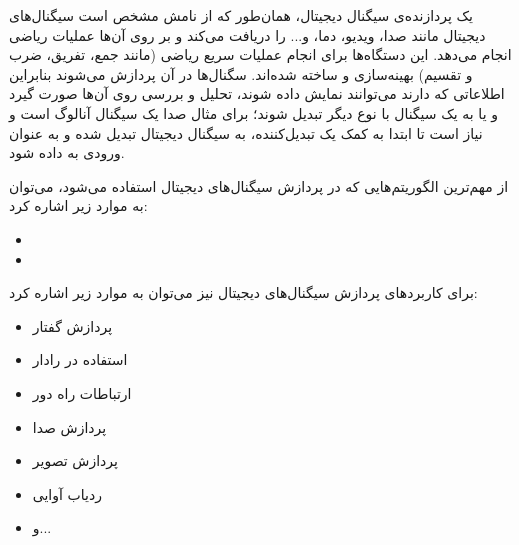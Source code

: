 

یک پردازنده‌ی سیگنال دیجیتال، همان‌طور که از نامش مشخص است سیگنال‌های دیجیتال مانند صدا، ویدیو، دما، و... را دریافت می‌کند و بر روی آن‌ها عملیات ریاضی انجام می‌دهد. این دستگاه‌ها برای انجام عملیات سریع ریاضی (مانند جمع، تفریق، ضرب و تقسیم) بهینه‌سازی و ساخته شده‌اند.
 سگنال‌ها در آن پردازش می‌شوند بنابراین اطلاعاتی که دارند می‌توانند نمایش داده شوند، تحلیل و بررسی روی آن‌ها صورت گیرد و یا به یک سیگنال با نوع دیگر تبدیل شوند؛ برای مثال صدا یک سیگنال آنالوگ است و نیاز است تا ابتدا به کمک یک تبدیل‌کننده، به سیگنال دیجیتال تبدیل شده و به عنوان ورودی به  داده شود.
 
از مهم‌ترین الگوریتم‌هایی که در پردازش سیگنال‌های دیجیتال استفاده می‌شود، می‌توان به موارد زیر اشاره کرد:
\begin{itemize}
	\item {}
	\item {}
\end{itemize}

برای کاربردهای پردازش سیگنال‌های دیجیتال نیز می‌توان به موارد زیر اشاره کرد:
\begin{itemize}
	\item پردازش گفتار
	\item استفاده در رادار
	\item ارتباطات راه دور
	\item پردازش صدا
	\item پردازش تصویر
	\item ردیاب آوایی
	\item و...
\end{itemize}
